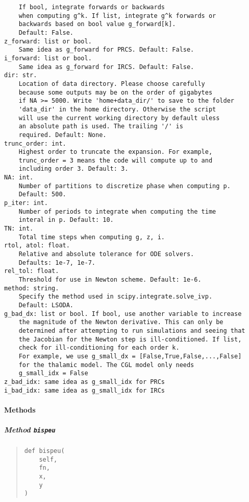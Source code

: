 \documentclass[
  english,
  a4paper,
  oneside]{article}
\begin{document}
\begin{verbatim}
    If bool, integrate forwards or backwards
    when computing g^k. If list, integrate g^k forwards or
    backwards based on bool value g_forward[k].
    Default: False.
z_forward: list or bool.
    Same idea as g_forward for PRCS. Default: False.
i_forward: list or bool.
    Same idea as g_forward for IRCS. Default: False.
dir: str.
    Location of data directory. Please choose carefully
    because some outputs may be on the order of gigabytes
    if NA >= 5000. Write 'home+data_dir/' to save to the folder
    'data_dir' in the home directory. Otherwise the script
    will use the current working directory by default uless
    an absolute path is used. The trailing '/' is
    required. Default: None.
trunc_order: int.
    Highest order to truncate the expansion. For example, 
    trunc_order = 3 means the code will compute up to and 
    including order 3. Default: 3.
NA: int.
    Number of partitions to discretize phase when computing p.
    Default: 500.
p_iter: int.
    Number of periods to integrate when computing the time 
    interal in p. Default: 10.
TN: int.
    Total time steps when computing g, z, i.
rtol, atol: float.
    Relative and absolute tolerance for ODE solvers.
    Defaults: 1e-7, 1e-7.
rel_tol: float.
    Threshold for use in Newton scheme. Default: 1e-6.
method: string.
    Specify the method used in scipy.integrate.solve_ivp.
    Default: LSODA.
g_bad_dx: list or bool. If bool, use another variable to increase
    the magnitude of the Newton derivative. This can only be
    determined after attempting to run simulations and seeing that
    the Jacobian for the Newton step is ill-conditioned. If list,
    check for ill-conditioning for each order k.
    For example, we use g_small_dx = [False,True,False,...,False]
    for the thalamic model. The CGL model only needs
    g_small_idx = False
z_bad_idx: same idea as g_small_idx for PRCs
i_bad_idx: same idea as g_small_idx for IRCs
\end{verbatim}

\hypertarget{methods}{%
\paragraph{Methods}\label{methods}}

\hypertarget{StrongCoupling.StrongCoupling.bispeu}{%
\subparagraph{\texorpdfstring{Method
\texttt{bispeu}}{Method bispeu}}\label{StrongCoupling.StrongCoupling.bispeu}}

\begin{quote}
\begin{verbatim}
def bispeu(
    self,
    fn,
    x,
    y
)
\end{verbatim}
\end{quote}
\end{document}
